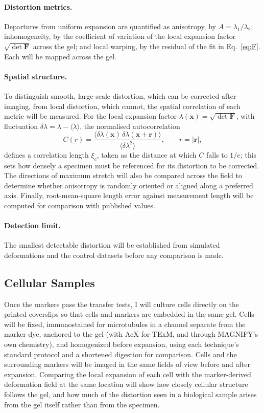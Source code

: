 \documentclass[%
 reprint,
 11pt,
 amsmath,amssymb,
 aps,
]{revtex4-2}
\begin{document}
\paragraph{Distortion metrics.}
Departures from uniform expansion are quantified as anisotropy, by
$A = \lambda_1/\lambda_2$; inhomogeneity, by the coefficient of variation of the local
expansion factor $\sqrt{\det\mathbf{F}}$ across the gel; and local warping, by the
residual of the fit in Eq.~\eqref{eq:F}.\cite{falk} Each will be mapped across the gel.

\paragraph{Spatial structure.}
To distinguish smooth, large-scale distortion, which can be corrected after imaging,
from local distortion, which cannot, the spatial correlation of each metric will be
measured. For the local expansion factor $\lambda(\mathbf{x}) = \sqrt{\det\mathbf{F}}$,
with fluctuation $\delta\lambda = \lambda - \langle\lambda\rangle$, the normalised
autocorrelation
\begin{equation}
  C(r) = \frac{\langle \delta\lambda(\mathbf{x})\,\delta\lambda(\mathbf{x}+\mathbf{r}) \rangle}
              {\langle \delta\lambda^2 \rangle}, \qquad r = |\mathbf{r}| ,
  \label{eq:corr}
\end{equation}
defines a correlation length $\xi_c$, taken as the distance at which $C$ falls to $1/e$;
this sets how densely a specimen must be referenced for its distortion to be corrected.
The directions of maximum stretch will also be compared across the field to determine
whether anisotropy is randomly oriented or aligned along a preferred axis. Finally,
root-mean-square length error against measurement length will be computed for comparison
with published values.
\paragraph{Detection limit.}
The smallest detectable distortion will be established from simulated deformations and
the control datasets before any comparison is made.

\subsection{Cellular Samples}
Once the markers pass the transfer tests, I will culture cells directly on the printed coverslips so that cells and markers are embedded in the same gel. Cells will be fixed, immunostained for microtubules in a channel separate from the marker dye, anchored to the gel (with AcX for TExM, and through MAGNIFY's own chemistry), and homogenized before expansion, using each technique's standard protocol and a shortened digestion for comparison. Cells and the surrounding markers will be imaged in the same fields of view before and after expansion. Comparing the local expansion of each cell with the marker-derived deformation field at the same location will show how closely cellular structure follows the gel, and how much of the distortion seen in a biological sample arises from the gel itself rather than from the specimen.
\end{document}
